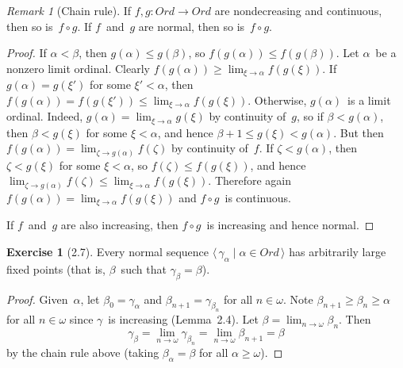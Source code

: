 \documentclass[letterpaper,12pt]{article}
\newcommand{\Ord}{\mathit{Ord}}
\newcommand{\after}{\circ}
\newcommand{\seq}[1]{\langle#1\rangle}
\theoremstyle{definition}
\newtheorem*{exer}{Exercise}
\theoremstyle{remark}
\newtheorem*{rmk}{Remark}
\begin{document}
\begin{rmk}[Chain rule]
If \(f,g:\Ord\to\Ord\) are nondecreasing and continuous, then so is~\(f\after g\). If \(f\)~and~\(g\) are normal, then so is~\(f\after g\).
\end{rmk}
\begin{proof}
If \(\alpha<\beta\), then \(g(\alpha)\le g(\beta)\), so \(f(g(\alpha))\le f(g(\beta))\). Let \(\alpha\)~be a nonzero limit ordinal. Clearly \(f(g(\alpha))\ge\lim_{\xi\to\alpha}f(g(\xi))\). If \(g(\alpha)=g(\xi')\) for some \(\xi'<\alpha\), then \(f(g(\alpha))=f(g(\xi'))\le\lim_{\xi\to\alpha}f(g(\xi))\). Otherwise, \(g(\alpha)\)~is a limit ordinal. Indeed, \(g(\alpha)=\lim_{\xi\to\alpha}g(\xi)\) by continuity of~\(g\), so if \(\beta<g(\alpha)\), then \(\beta<g(\xi)\) for some \(\xi<\alpha\), and hence \(\beta+1\le g(\xi)<g(\alpha)\). But then \(f(g(\alpha))=\lim_{\zeta\to g(\alpha)}f(\zeta)\) by continuity of~\(f\). If \(\zeta<g(\alpha)\), then \(\zeta<g(\xi)\) for some \(\xi<\alpha\), so \(f(\zeta)\le f(g(\xi))\), and hence \(\lim_{\zeta\to g(\alpha)}f(\zeta)\le\lim_{\xi\to\alpha}f(g(\xi))\). Therefore again \(f(g(\alpha))=\lim_{\xi\to\alpha}f(g(\xi))\) and \(f\after g\)~is continuous.

If \(f\)~and~\(g\) are also increasing, then \(f\after g\)~is increasing and hence normal.
\end{proof}

\begin{exer}[2.7]
Every normal sequence \(\seq{\,\gamma_{\alpha}\mid\alpha\in\Ord\,}\) has arbitrarily large fixed points (that is, \(\beta\)~such that \(\gamma_{\beta}=\beta\)).
\end{exer}
\begin{proof}
Given~\(\alpha\), let \(\beta_0=\gamma_{\alpha}\) and \(\beta_{n+1}=\gamma_{\beta_n}\) for all \(n\in\omega\). Note \(\beta_{n+1}\ge\beta_n\ge\alpha\) for all \(n\in\omega\) since \(\gamma\)~is increasing (Lemma~2.4). Let \(\beta=\lim_{n\to\omega}\beta_n\). Then
\[\gamma_{\beta}=\lim_{n\to\omega}\gamma_{\beta_n}=\lim_{n\to\omega}\beta_{n+1}=\beta\]
by the chain rule above (taking \(\beta_{\alpha}=\beta\) for all \(\alpha\ge\omega\)).
\end{proof}
\end{document}
